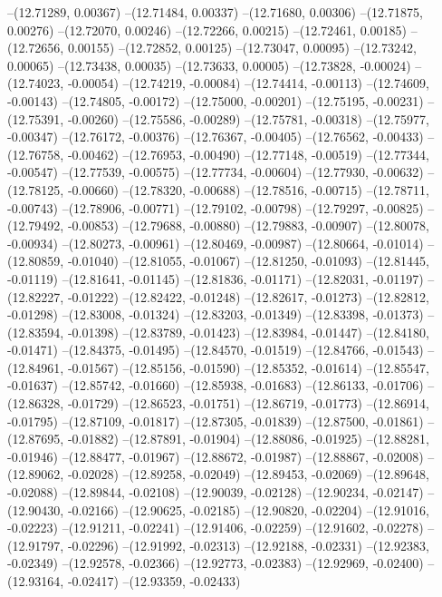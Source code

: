 --(12.71289, 0.00367)
--(12.71484, 0.00337)
--(12.71680, 0.00306)
--(12.71875, 0.00276)
--(12.72070, 0.00246)
--(12.72266, 0.00215)
--(12.72461, 0.00185)
--(12.72656, 0.00155)
--(12.72852, 0.00125)
--(12.73047, 0.00095)
--(12.73242, 0.00065)
--(12.73438, 0.00035)
--(12.73633, 0.00005)
--(12.73828, -0.00024)
--(12.74023, -0.00054)
--(12.74219, -0.00084)
--(12.74414, -0.00113)
--(12.74609, -0.00143)
--(12.74805, -0.00172)
--(12.75000, -0.00201)
--(12.75195, -0.00231)
--(12.75391, -0.00260)
--(12.75586, -0.00289)
--(12.75781, -0.00318)
--(12.75977, -0.00347)
--(12.76172, -0.00376)
--(12.76367, -0.00405)
--(12.76562, -0.00433)
--(12.76758, -0.00462)
--(12.76953, -0.00490)
--(12.77148, -0.00519)
--(12.77344, -0.00547)
--(12.77539, -0.00575)
--(12.77734, -0.00604)
--(12.77930, -0.00632)
--(12.78125, -0.00660)
--(12.78320, -0.00688)
--(12.78516, -0.00715)
--(12.78711, -0.00743)
--(12.78906, -0.00771)
--(12.79102, -0.00798)
--(12.79297, -0.00825)
--(12.79492, -0.00853)
--(12.79688, -0.00880)
--(12.79883, -0.00907)
--(12.80078, -0.00934)
--(12.80273, -0.00961)
--(12.80469, -0.00987)
--(12.80664, -0.01014)
--(12.80859, -0.01040)
--(12.81055, -0.01067)
--(12.81250, -0.01093)
--(12.81445, -0.01119)
--(12.81641, -0.01145)
--(12.81836, -0.01171)
--(12.82031, -0.01197)
--(12.82227, -0.01222)
--(12.82422, -0.01248)
--(12.82617, -0.01273)
--(12.82812, -0.01298)
--(12.83008, -0.01324)
--(12.83203, -0.01349)
--(12.83398, -0.01373)
--(12.83594, -0.01398)
--(12.83789, -0.01423)
--(12.83984, -0.01447)
--(12.84180, -0.01471)
--(12.84375, -0.01495)
--(12.84570, -0.01519)
--(12.84766, -0.01543)
--(12.84961, -0.01567)
--(12.85156, -0.01590)
--(12.85352, -0.01614)
--(12.85547, -0.01637)
--(12.85742, -0.01660)
--(12.85938, -0.01683)
--(12.86133, -0.01706)
--(12.86328, -0.01729)
--(12.86523, -0.01751)
--(12.86719, -0.01773)
--(12.86914, -0.01795)
--(12.87109, -0.01817)
--(12.87305, -0.01839)
--(12.87500, -0.01861)
--(12.87695, -0.01882)
--(12.87891, -0.01904)
--(12.88086, -0.01925)
--(12.88281, -0.01946)
--(12.88477, -0.01967)
--(12.88672, -0.01987)
--(12.88867, -0.02008)
--(12.89062, -0.02028)
--(12.89258, -0.02049)
--(12.89453, -0.02069)
--(12.89648, -0.02088)
--(12.89844, -0.02108)
--(12.90039, -0.02128)
--(12.90234, -0.02147)
--(12.90430, -0.02166)
--(12.90625, -0.02185)
--(12.90820, -0.02204)
--(12.91016, -0.02223)
--(12.91211, -0.02241)
--(12.91406, -0.02259)
--(12.91602, -0.02278)
--(12.91797, -0.02296)
--(12.91992, -0.02313)
--(12.92188, -0.02331)
--(12.92383, -0.02349)
--(12.92578, -0.02366)
--(12.92773, -0.02383)
--(12.92969, -0.02400)
--(12.93164, -0.02417)
--(12.93359, -0.02433)
